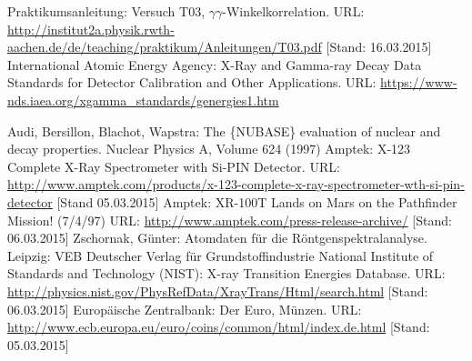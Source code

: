 \documentclass{../Misc/MontavonLaTeX/Montavon}
\begin{document}
\newpage
\begin{thebibliography}{xxxx}
 Praktikumsanleitung: Versuch T03, $\gamma \gamma$-Winkelkorrelation. URL: \url{http://institut2a.physik.rwth-aachen.de/de/teaching/praktikum/Anleitungen/T03.pdf} [Stand: 16.03.2015]
 International Atomic Energy Agency: X-Ray and Gamma-ray Decay Data Standards for Detector Calibration and Other Applications. URL: \url{https://www-nds.iaea.org/xgamma_standards/genergies1.htm}

 Audi, Bersillon, Blachot, Wapstra: The \{NUBASE\} evaluation of nuclear and decay properties. Nuclear Physics A, Volume 624 (1997)
 Amptek: X-123 Complete X-Ray Spectrometer with Si-PIN Detector. URL: \url{http://www.amptek.com/products/x-123-complete-x-ray-spectrometer-wth-si-pin-detector} [Stand 05.03.2015]
 Amptek: XR-100T Lands on Mars on the Pathfinder Mission! (7/4/97) URL: \url{http://www.amptek.com/press-release-archive/} [Stand: 06.03.2015]
 Zschornak, Günter: Atomdaten für die Röntgenspektralanalyse. Leipzig: VEB Deutscher Verlag für Grundstoffindustrie
 National Institute of Standards and Technology (NIST): X-ray Transition Energies Database. URL: \url{http://physics.nist.gov/PhysRefData/XrayTrans/Html/search.html} [Stand: 06.03.2015]
 Europäische Zentralbank: Der Euro, Münzen. URL: \url{http://www.ecb.europa.eu/euro/coins/common/html/index.de.html} [Stand: 05.03.2015]
\end{thebibliography}
\end{document}
